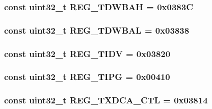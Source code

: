\label{namespaceiGbReg_ac15be2850d41581ca8530f32a90e5b0f}
\hypertarget{namespaceiGbReg_a050b53dacdbc8075f739b04caf5bfd6c}{
\subsubsection[{REG\_\-TDWBAH}]{\setlength{\rightskip}{0pt plus 5cm}const {\bf uint32\_\-t} {\bf REG\_\-TDWBAH} = 0x0383C}}
\label{namespaceiGbReg_a050b53dacdbc8075f739b04caf5bfd6c}
\hypertarget{namespaceiGbReg_ab8f86fd995c08da473a1d40511517901}{
\subsubsection[{REG\_\-TDWBAL}]{\setlength{\rightskip}{0pt plus 5cm}const {\bf uint32\_\-t} {\bf REG\_\-TDWBAL} = 0x03838}}
\label{namespaceiGbReg_ab8f86fd995c08da473a1d40511517901}
\hypertarget{namespaceiGbReg_a871dec634edf3b35037939946579d39b}{
\subsubsection[{REG\_\-TIDV}]{\setlength{\rightskip}{0pt plus 5cm}const {\bf uint32\_\-t} {\bf REG\_\-TIDV} = 0x03820}}
\label{namespaceiGbReg_a871dec634edf3b35037939946579d39b}
\hypertarget{namespaceiGbReg_a533e7ea17bb2e80603d2da871d8ee499}{
\subsubsection[{REG\_\-TIPG}]{\setlength{\rightskip}{0pt plus 5cm}const {\bf uint32\_\-t} {\bf REG\_\-TIPG} = 0x00410}}
\label{namespaceiGbReg_a533e7ea17bb2e80603d2da871d8ee499}
\hypertarget{namespaceiGbReg_adcec938fa39b4e7ff85d6b1622ccd3a5}{
\subsubsection[{REG\_\-TXDCA\_\-CTL}]{\setlength{\rightskip}{0pt plus 5cm}const {\bf uint32\_\-t} {\bf REG\_\-TXDCA\_\-CTL} = 0x03814}}
\label{namespaceiGbReg_adcec938fa39b4e7ff85d6b1622ccd3a5}
